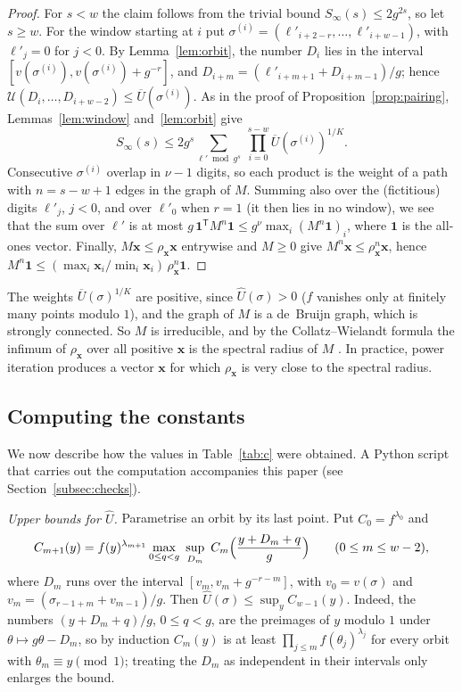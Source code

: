 \documentclass[11pt]{amsart}
\theoremstyle{definition}
\numberwithin{equation}{section}
\newcommand{\cU}{\mathcal{U}}
\newcommand{\Sinf}{S_\infty}
\begin{document}
\begin{proof}
For $s<w$ the claim follows from the trivial bound $\Sinf(s)\le2g^{2s}$, so
let $s\ge w$. For the window starting at $i$ put
$\sigma^{(i)}=(\ell'_{i+2-r},\dots,\ell'_{i+w-1})$, with $\ell'_j=0$ for
$j<0$. By Lemma~\ref{lem:orbit}, the number $D_i$ lies in the interval
$[v(\sigma^{(i)}),v(\sigma^{(i)})+g^{-r}]$, and
$D_{i+m}=(\ell'_{i+m+1}+D_{i+m-1})/g$; hence
$\cU(D_i,\dots,D_{i+w-2})\le\overline U(\sigma^{(i)})$. As in the proof of
Proposition~\ref{prop:pairing}, Lemmas~\ref{lem:window} and~\ref{lem:orbit}
give
\[
\Sinf(s)\le2g^s\sum_{\ell'\bmod g^s}\ \prod_{i=0}^{s-w}\overline U(\sigma^{(i)})^{1/K}.
\]
Consecutive $\sigma^{(i)}$ overlap in $\nu-1$ digits, so each product is
the weight of a path with $n=s-w+1$ edges in the graph of $M$. Summing also
over the (fictitious) digits $\ell'_j$, $j<0$, and over $\ell'_0$ when $r=1$
(it then lies in no window), we see that the sum over $\ell'$ is at most
$g\,\mathbf 1^{\mathsf T}M^n\mathbf 1\le g^\nu\max_i(M^n\mathbf 1)_i$, where
$\mathbf 1$ is the all-ones vector. Finally, $M\mathbf x\le\rho_{\mathbf x}\mathbf x$
entrywise and $M\ge0$ give $M^n\mathbf x\le\rho_{\mathbf x}^n\mathbf x$, hence
$M^n\mathbf 1\le(\max_i\mathbf x_i/\min_i\mathbf x_i)\,\rho_{\mathbf x}^n\mathbf 1$.
\end{proof}

The weights $\overline U(\sigma)^{1/K}$ are positive, since $\widehat U(\sigma)>0$
($f$ vanishes only at finitely many points modulo $1$), and the graph of
$M$ is a de~Bruijn graph, which is strongly connected. So $M$ is
irreducible, and by the Collatz--Wielandt formula the infimum of
$\rho_{\mathbf x}$ over all positive $\mathbf x$ is the spectral radius of
$M$ \cite[Chapter~8]{HJ}. In practice, power iteration produces a vector
$\mathbf x$ for which $\rho_{\mathbf x}$ is very close to the spectral radius.

\subsection{Computing the constants}\label{subsec:comp}
We now describe how the values in Table~\ref{tab:c} were obtained. A Python
script that carries out the computation accompanies this paper (see
Section~\ref{subsec:checks}).

\emph{Upper bounds for $\widehat U$.} Parametrise an orbit by its last point.
Put $C_0=f^{\lambda_0}$ and
\[
C_{m+1}(y)=f(y)^{\lambda_{m+1}}\max_{0\le q<g}\ \sup_{D_m}\ C_m\Bigl(\frac{y+D_m+q}g\Bigr)\qquad(0\le m\le w-2),
\]
where $D_m$ runs over the interval $[v_m,v_m+g^{-r-m}]$, with $v_0=v(\sigma)$
and $v_m=(\sigma_{r-1+m}+v_{m-1})/g$. Then $\widehat U(\sigma)\le\sup_yC_{w-1}(y)$.
Indeed, the numbers $(y+D_m+q)/g$, $0\le q<g$, are the preimages of $y$
modulo $1$ under $\theta\mapsto g\theta-D_m$, so by induction $C_m(y)$ is at
least $\prod_{j\le m}f(\theta_j)^{\lambda_j}$ for every orbit with
$\theta_m\equiv y\pmod1$; treating the $D_m$ as independent in their
intervals only enlarges the bound.
\end{document}
